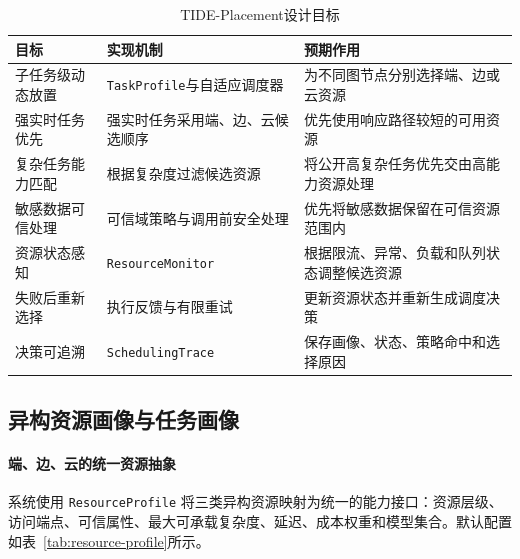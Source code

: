 
\begin{table}[htbp]
    \centering
    \caption{TIDE-Placement设计目标}
    \label{tab:placement-objectives}
    \begin{tabularx}{\textwidth}{p{}X X}
        \toprule
        目标 & 实现机制 & 预期作用 \\
        \midrule
        子任务级动态放置
        & \texttt{TaskProfile}与自适应调度器
        & 为不同图节点分别选择端、边或云资源 \\

        强实时任务优先
        & 强实时任务采用端、边、云候选顺序
        & 优先使用响应路径较短的可用资源 \\

        复杂任务能力匹配
        & 根据复杂度过滤候选资源
        & 将公开高复杂任务优先交由高能力资源处理 \\

        敏感数据可信处理
        & 可信域策略与调用前安全处理
        & 优先将敏感数据保留在可信资源范围内 \\

        资源状态感知
        & \texttt{ResourceMonitor}
        & 根据限流、异常、负载和队列状态调整候选资源 \\

        失败后重新选择
        & 执行反馈与有限重试
        & 更新资源状态并重新生成调度决策 \\

        决策可追溯
        & \texttt{SchedulingTrace}
        & 保存画像、状态、策略命中和选择原因 \\
        \bottomrule
    \end{tabularx}
\end{table}

\subsection{异构资源画像与任务画像}

\paragraph{端、边、云的统一资源抽象}

系统使用 \texttt{ResourceProfile} 将三类异构资源映射为统一的能力接口：资源层级、访问端点、可信属性、最大可承载复杂度、延迟、成本权重和模型集合。默认配置如表~\ref{tab:resource-profile}所示。

